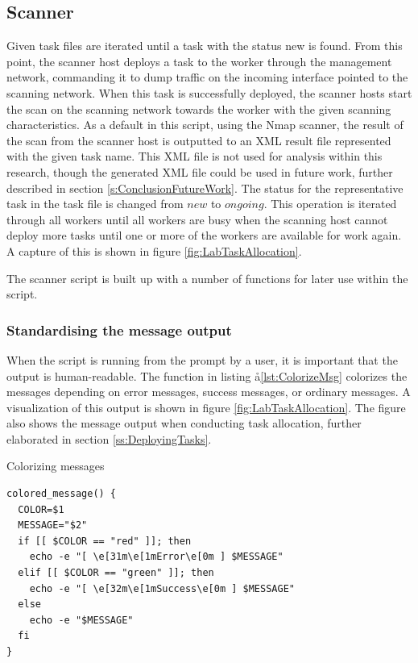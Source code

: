 \subsection{Scanner}
\label{s:ScannerScript}
Given task files are iterated until a task with the status new is found.
From this point, the scanner host deploys a task to the worker through the management network, commanding it to dump traffic on the incoming interface pointed to the scanning network.
When this task is successfully deployed, the scanner hosts start the scan on the scanning network towards the worker with the given scanning characteristics. As a default in this script, using the Nmap scanner, the result of the scan from the scanner host is outputted to an XML result file represented with the given task name. This XML file is not used for analysis within this research, though the generated XML file could be used in future work, further described in section \ref{s:ConclusionFutureWork}. The status for the representative task in the task file is changed from $new$ to $ongoing$. This operation is iterated through all workers until all workers are busy when the scanning host cannot deploy more tasks until one or more of the workers are available for work again. A capture of this is shown in figure \ref{fig:LabTaskAllocation}.

The scanner script is built up with a number of functions for later use within the script.

\subsubsection{Standardising the message output}
When the script is running from the prompt by a user, it is important that the output is human-readable.
The function in listing å\ref{lst:ColorizeMsg} colorizes the messages depending on error messages, success messages, or ordinary messages.
A visualization of this output is shown in figure \ref{fig:LabTaskAllocation}. The figure also shows the message output when conducting task allocation, further elaborated in section \ref{ss:DeployingTasks}.

\begin{listing}[!ht]
\caption{Colorizing messages}
\label{lst:ColorizeMsg}
\begin{verbatim}
colored_message() {
  COLOR=$1
  MESSAGE="$2"
  if [[ $COLOR == "red" ]]; then
    echo -e "[ \e[31m\e[1mError\e[0m ] $MESSAGE"
  elif [[ $COLOR == "green" ]]; then
    echo -e "[ \e[32m\e[1mSuccess\e[0m ] $MESSAGE"
  else
    echo -e "$MESSAGE"
  fi
}
\end{verbatim}
\end{listing}

